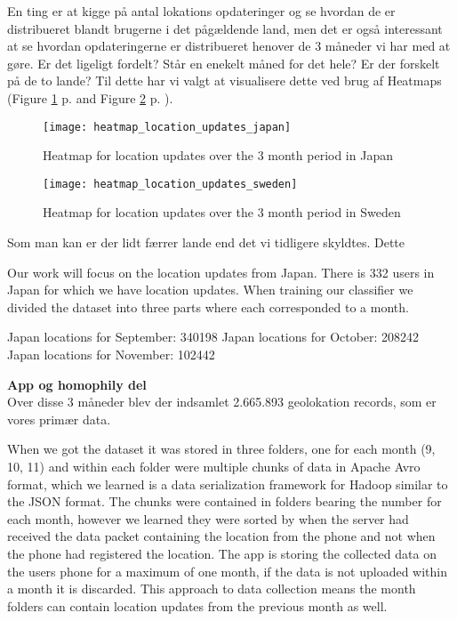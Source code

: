 En ting er at kigge på antal lokations opdateringer og se hvordan de er distribueret blandt brugerne i det pågældende land, men det er også interessant at se hvordan opdateringerne er distribueret henover de 3 måneder vi har med at gøre. Er det ligeligt fordelt? Står en enekelt måned for det hele? Er der forskelt på de to lande? Til dette har vi valgt at visualisere dette ved brug af Heatmaps (Figure \ref{fig:heatmap_jap} p.  \pageref{fig:heatmap_jap} and Figure \ref{fig:heatmap_swe} p. \pageref{fig:heatmap_swe}). 
\begin{figure}[H]
    \centering
    \texttt{[image: heatmap\_location\_updates\_japan]}
    \caption{Heatmap for location updates over the 3 month period in Japan}
    \label{fig:heatmap_jap}
\end{figure}


\begin{figure}[H]
    \centering
    \texttt{[image: heatmap\_location\_updates\_sweden]}
    \caption{Heatmap for location updates over the 3 month period in Sweden}
    \label{fig:heatmap_swe}
\end{figure}



Som man kan er der lidt færrer lande end det vi tidligere skyldtes. Dette 

Our work will focus on the location updates from Japan. There is 332 users in Japan for which we have location updates.
When training our classifier we divided the dataset into three parts where each corresponded to a month.

Japan locations for September: 340198
Japan locations for October: 208242
Japan locations for November: 102442

\textbf{App og homophily del}\\


Over disse 3 måneder blev der indsamlet 2.665.893 geolokation records, som er vores primær data. 

When we got the dataset it was stored in three folders, one for each month (9, 10, 11) and within each folder were multiple chunks of data in Apache Avro format\cite{apacheavro}, which we learned is a data serialization framework for Hadoop similar to the JSON format. The chunks were contained in folders bearing the number for each month, however we learned they were sorted by when the server had received the data packet containing the location from the phone and not when the phone had registered the location. The app is storing the collected data on the users phone for a maximum of one month, if the data is not uploaded within a month it is discarded. This approach to data collection means the month folders can contain location updates from the previous month as well.

